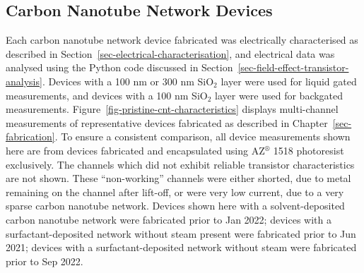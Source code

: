 \documentclass[
  a4paper,
]{scrbook}
\begin{document}
\hypertarget{sec-cnt-devices}{%
\subsection{Carbon Nanotube Network Devices}\label{sec-cnt-devices}}

Each carbon nanotube network device fabricated was electrically
characterised as described in
Section~\ref{sec-electrical-characterisation}, and electrical data was
analysed using the Python code discussed in
Section~\ref{sec-field-effect-transistor-analysis}. Devices with a 100
nm or 300 nm SiO\(_2\) layer were used for liquid gated measurements,
and devices with a 100 nm SiO\(_2\) layer were used for backgated
measurements. Figure~\ref{fig-pristine-cnt-characteristics} displays
multi-channel measurements of representative devices fabricated as
described in Chapter~\ref{sec-fabrication}. To ensure a consistent
comparison, all device measurements shown here are from devices
fabricated and encapsulated using AZ\(^\circledR\) 1518 photoresist
exclusively. The channels which did not exhibit reliable transistor
characteristics are not shown. These ``non-working'' channels were
either shorted, due to metal remaining on the channel after lift-off, or
were very low current, due to a very sparse carbon nanotube network.
Devices shown here with a solvent-deposited carbon nanotube network were
fabricated prior to Jan 2022; devices with a surfactant-deposited
network without steam present were fabricated prior to Jun 2021; devices
with a surfactant-deposited network without steam were fabricated prior
to Sep 2022.
\end{document}
